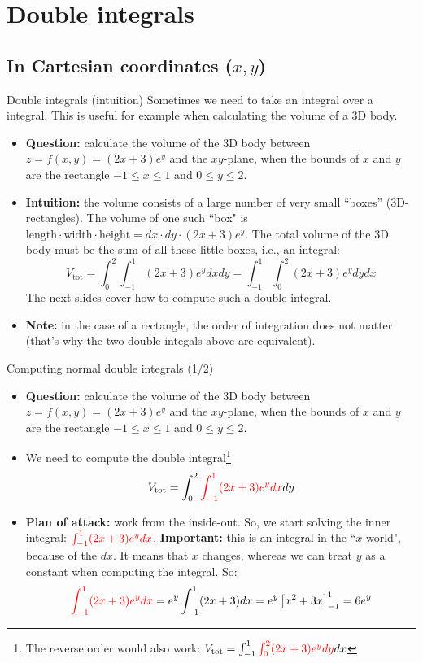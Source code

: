 \section{Double integrals}
\subsection{In Cartesian coordinates ($x,y$)}
\begin{frame}{Double integrals (intuition)}
    Sometimes we need to take an integral over a integral.
    This is useful for example when calculating the volume of a 3D body.
    \begin{itemize}
        \item \textbf{Question:} calculate the volume of the 3D body between $z=f(x,y)=(2x+3)e^y$ and the $xy$-plane, when the bounds of $x$ and $y$ are the rectangle $-1\leq x\leq1$ and $0\leq y\leq2$.
        \item \textbf{Intuition:} the volume consists of a large number of very small ``boxes'' (3D-rectangles). The volume of one such ``box" is $\text{length}\cdot\text{width}\cdot\text{height}=dx\cdot dy\cdot(2x+3)e^y$. The total volume of the 3D body must be the sum of all these little boxes, i.e., an integral:
            \[V_{\text{tot}}=\int_{0}^{2}\int_{-1}^{1}(2x+3)e^y dxdy=\int_{-1}^{1}\int_{0}^{2}(2x+3)e^y dydx\]
        The next slides cover how to compute such a double integral.
    \item    \textbf{Note:} in the case of a rectangle, the order of integration does not matter (that's why the two double integals above are equivalent).
    \end{itemize}
\end{frame}

\begin{frame}{Computing normal double integrals (1/2)}
    \begin{itemize}
        \item \textbf{Question:} calculate the volume of the 3D body between $z=f(x,y)=(2x+3)e^y$ and the $xy$-plane, when the bounds of $x$ and $y$ are the rectangle $-1\leq x\leq1$ and $0\leq y\leq2$.
        \item We need to compute the double integral\footnote{The reverse order would also work:
            $V_{\text{tot}}=\int_{-1}^{1}\textcolor{red}{\int_{0}^{2}(2x+3)e^y dy}dx$}
            \[V_{\text{tot}}=\int_{0}^{2}\textcolor{red}{\int_{-1}^{1}(2x+3)e^y dx}dy\]
        \item \textbf{Plan of attack:} work from the inside-out. So, we start solving the inner integral: $\textcolor{red}{\int_{-1}^{1}(2x+3)e^y dx}$. \textbf{Important:} this is an integral in the ``$x$-world", because of the $dx$. It means that $x$ changes, whereas we can treat $y$ as a constant when computing the integral. So:
            \[\textcolor{red}{\int_{-1}^{1}(2x+3)e^y dx}=e^y\int_{-1}^1(2x+3)dx=e^y\left[x^2+3x\right]_{-1}^1=6e^y\]
    \end{itemize}
\end{frame}

